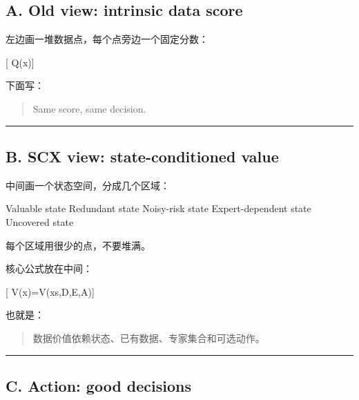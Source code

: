 \documentclass[
  12pt,
]{ctexart}
\newenvironment{Shaded}{}{}
\newcommand{\NormalTok}[1]{#1}
\begin{document}
\subsection{\texorpdfstring{\textbf{A. Old view: intrinsic data
score}}{A. Old view: intrinsic data score}}\label{a.-old-view-intrinsic-data-score}

左边画一堆数据点，每个点旁边一个固定分数：

{[} Q(x){]}

下面写：

\begin{quote}
Same score, same decision.
\end{quote}

\begin{center}\rule{0.5\linewidth}{0.5pt}\end{center}

\subsection{\texorpdfstring{\textbf{B. SCX view: state-conditioned
value}}{B. SCX view: state-conditioned value}}\label{b.-scx-view-state-conditioned-value}

中间画一个状态空间，分成几个区域：

\begin{Shaded}
\begin{Highlighting}[]
\NormalTok{Valuable state}
\NormalTok{Redundant state}
\NormalTok{Noisy{-}risk state}
\NormalTok{Expert{-}dependent state}
\NormalTok{Uncovered state}
\end{Highlighting}
\end{Shaded}

每个区域用很少的点，不要堆满。

核心公式放在中间：

{[} V(x)=V(x\mid s,\mathcal D,\mathcal E,\mathcal A){]}

也就是：

\begin{quote}
数据价值依赖状态、已有数据、专家集合和可选动作。
\end{quote}

\begin{center}\rule{0.5\linewidth}{0.5pt}\end{center}

\subsection{\texorpdfstring{\textbf{C. Action: good
decisions}}{C. Action: good decisions}}\label{c.-action-good-decisions}
\end{document}
